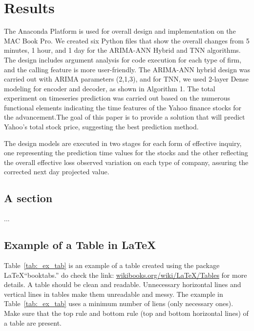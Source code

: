 \chapter{Results}
\label{ch:results}

The Anaconda Platform is used for overall design and implementation on the MAC Book Pro. We created six Python files that show the overall changes from 5 minutes, 1 hour, and 1 day for the ARIMA-ANN Hybrid and TNN algorithms. The design includes argument analysis for code execution for each type of firm, and the calling feature is more user-friendly. The ARIMA-ANN hybrid design was carried out with ARIMA parameters (2,1,3), and for TNN, we used 2-layer Dense modeling for encoder and decoder, as shown in Algorithm 1. The total experiment on timeseries prediction was carried out based on the numerous functional elements indicating the time features of the Yahoo finance stocks for the advancement.The goal of this paper is to provide a solution that will predict Yahoo's total stock price, suggesting the best prediction method.

The design models are executed in two stages for each form of effective inquiry, one representing the prediction time values for the stocks and the other reflecting the overall effective loss observed variation on each type of company, assuring the corrected next day projected value.
 




\section{A section}

...

\clearpage
\section{Example of a Table in \LaTeX}
Table~\ref{tab:_ex_tab} is an example of a table created using the package \LaTeX  ``booktabs.'' do check the link: \href{https://en.wikibooks.org/wiki/LaTeX/Tables}{wikibooks.org/wiki/LaTeX/Tables} for more details. A table should be clean and readable. Unnecessary horizontal lines and vertical lines in tables make them unreadable and messy. The example in Table~\ref{tab:_ex_tab} uses a minimum number of liens (only necessary ones). Make sure that the top rule and bottom rule (top and bottom horizontal lines) of a table are present. 

